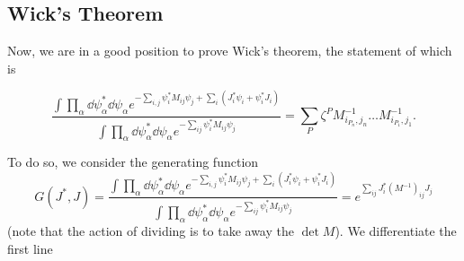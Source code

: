 \documentclass[twoside,symmetric, openany, 12pt]{./tuftebook}
\theoremstyle{definition}
\theoremstyle{definition}
\theoremstyle{definition}
\begin{document}
	\subsection{Wick's Theorem}
	Now, we are in a good position to prove Wick's theorem, the statement of which is
\begin{tcolorbox}[title=Wick's Theorem]
\[
	\frac{\int \prod_\alpha \dd{\psi_\alpha^*}\dd{\psi_\alpha} e^{-\sum_{i,j} \psi_i^* M_{ij} \psi_j + \sum_i (J_i^* \psi_i + \psi_i^* J_i)}}{\int \prod_\alpha \dd{\psi_\alpha^*}\dd{\psi_\alpha} e^{-\sum_{ij} \psi_i^* M_{ij} \psi_j}}=\sum_P \zeta^P M^{-1}_{i_{P_n}, j_n} \dots M^{-1}_{i_{P_1}, j_1}
.\] 	
\end{tcolorbox}
	To do so, we consider the generating function
	\[
		G(J^*, J) = \frac{\int \prod_\alpha \dd{\psi_\alpha^*}\dd{\psi_\alpha} e^{-\sum_{i,j} \psi_i^* M_{ij} \psi_j + \sum_i (J_i^* \psi_i + \psi_i^* J_i)}}{\int \prod_\alpha \dd{\psi_\alpha^*}\dd{\psi_\alpha} e^{-\sum_{ij} \psi_i^* M_{ij} \psi_j}}=e^{\sum_{ij} J_i^* (M^{-1})_{ij}J_j}
	\]
	(note that the action of dividing is to take away the $\det M$). We differentiate the first line 
\end{document}
